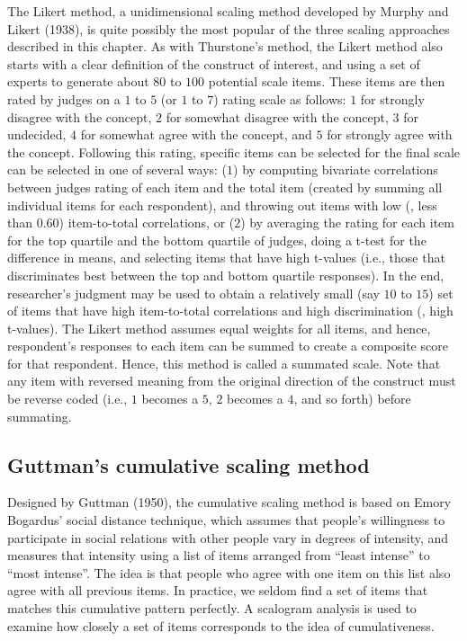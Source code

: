 The Likert method, a unidimensional scaling method developed by Murphy and Likert (1938), is quite possibly the most popular of the three scaling approaches described in this chapter. As with Thurstone's method, the Likert method also starts with a clear definition of the construct of interest, and using a set of experts to generate about $ 80 $ to $ 100 $ potential scale items. These items are then rated by judges on a $ 1 $ to $ 5 $ (or $ 1 $ to $ 7 $) rating scale as follows: $ 1 $ for strongly disagree with the concept, $ 2 $ for somewhat disagree with the concept, $ 3 $ for undecided, $ 4 $ for somewhat agree with the concept, and $ 5 $ for strongly agree with the concept. Following this rating, specific items can be selected for the final scale can be selected in one of several ways: ($ 1 $) by computing bivariate correlations between judges rating of each item and the total item (created by summing all individual items for each respondent), and throwing out items with low (\eg, less than $ 0.60 $) item-to-total correlations, or ($ 2 $) by averaging the rating for each item for the top quartile and the bottom quartile of judges, doing a t-test for the difference in means, and selecting items that have high t-values (i.e., those that discriminates best between the top and bottom quartile responses). In the end, researcher's judgment may be used to obtain a relatively small (say $ 10 $ to $ 15 $) set of items that have high item-to-total correlations and high discrimination (\ie, high t-values). The Likert method assumes equal weights for all items, and hence, respondent's responses to each item can be summed to create a composite score for that respondent. Hence, this method is called a summated scale. Note that any item with reversed meaning from the original direction of the construct must be reverse coded (i.e., $ 1 $ becomes a $ 5 $, $ 2 $ becomes a $ 4 $, and so forth) before summating.

\subsection{Guttman's cumulative scaling method}

Designed by Guttman (1950), the cumulative scaling method is based on Emory Bogardus' social distance technique, which assumes that people's willingness to participate in social relations with other people vary in degrees of intensity, and measures that intensity using a list of items arranged from ``least intense'' to ``most intense''. The idea is that people who agree with one item on this list also agree with all previous items. In practice, we seldom find a set of items that matches this cumulative pattern perfectly. A scalogram analysis is used to examine how closely a set of items corresponds to the idea of cumulativeness.

